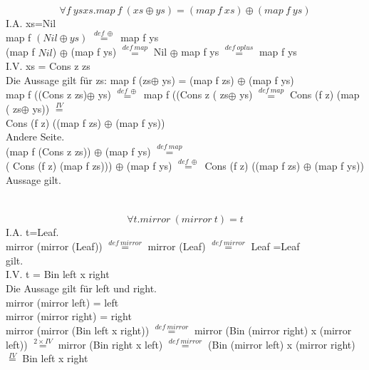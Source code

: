 \documentclass{article}
\theoremstyle{definition}
\begin{document}
	\subsubsection{}
	\[\forall f\ ys xs.map\ f\ (xs\oplus ys) = (map\ f\ xs) \oplus (map\ f\ ys)\]
	I.A. xs=Nil\\
	map f $(Nil\oplus ys)$ $\stackrel{def\ \oplus}{=}$ map f ys\\
	(map f $Nil$) $\oplus$ (map f ys) $\stackrel{def\ map}{=}$ Nil $\oplus$ map f ys $\stackrel{def\ oplus}{=}$ map f ys\\
	I.V. xs = Cons z zs\\
	Die Aussage gilt für zs: map f (zs$\oplus$ ys) = (map f zs) $\oplus$ (map f ys)\\
	map f ((Cons z zs)$\oplus$ ys) $\stackrel{def\ \oplus}{=}$ map f ((Cons z ( zs$\oplus$ ys) $\stackrel{def\ map}{=}$  Cons (f z) (map ( zs$\oplus$ ys)) $\stackrel{IV}{=}$\\
	Cons (f z) ((map f zs) $\oplus$ (map f ys))\\
	Andere Seite.\\
	(map f (Cons z zs)) $\oplus$ (map f ys) $\stackrel{def\ map}{=}$\\
	( Cons (f z) (map f zs))) $\oplus$ (map f ys) $\stackrel{def\ \oplus}{=}$ Cons (f z) ((map f zs) $\oplus$ (map f ys))\\
	Aussage gilt.\\
	\section{}
	\subsection{}
	\[\forall t. mirror\ (mirror\ t) = t\]
	I.A. t=Leaf.\\
	mirror (mirror (Leaf)) $\stackrel{def\ mirror}{=}$ mirror (Leaf) $\stackrel{def\ mirror}{=}$ Leaf =Leaf\\
	gilt.\\
	I.V. t = Bin left x right\\
	Die Aussage gilt für left und right.\\
	mirror (mirror left) = left\\
	mirror (mirror right) = right\\
	mirror (mirror (Bin left x right)) $\stackrel{def\ mirror}{=}$ mirror (Bin (mirror right) x (mirror left)) $\stackrel{2\times IV}{=}$ mirror (Bin right x left) $\stackrel{def\ mirror}{=}$ (Bin (mirror left) x (mirror right) $\stackrel{IV}{=}$ Bin left x right
\end{document}
